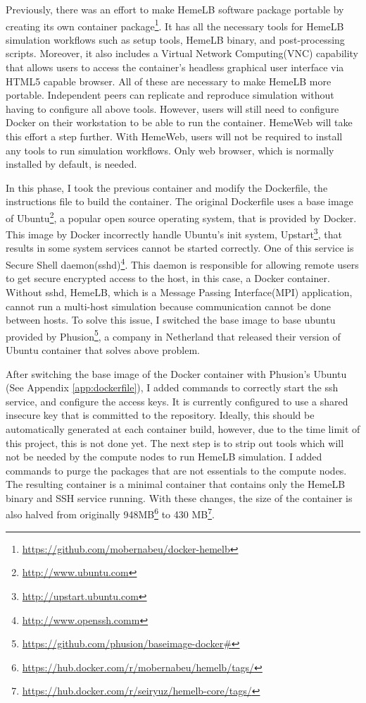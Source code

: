 Previously, there was an effort to make HemeLB software package portable by creating its own container package\footnote{\url{https://github.com/mobernabeu/docker-hemelb}}. It has all the necessary tools for HemeLB simulation workflows such as setup tools, HemeLB binary, and post-processing scripts. Moreover, it also includes a Virtual Network Computing(VNC) capability that allows users to access the container's headless graphical user interface via HTML5 capable browser. All of these are necessary to make HemeLB more portable. Independent peers can replicate and reproduce simulation without having to configure all above tools. However, users will still need to configure Docker on their workstation to be able to run the container. HemeWeb will take this effort a step further. With HemeWeb, users will not be required to install any tools to run simulation workflows. Only web browser, which is normally installed by default, is needed.


In this phase, I took the previous container and modify the Dockerfile, the instructions file to build the container. The original Dockerfile uses a base image of Ubuntu\footnote{\url{http://www.ubuntu.com}}, a popular open source operating system, that is provided by Docker. This image by Docker incorrectly handle Ubuntu's init system, Upstart\footnote{\url{http://upstart.ubuntu.com}}, that results in some system services cannot be started correctly. One of this service is Secure Shell daemon(sshd)\footnote{\url{http://www.openssh.comm}}. This daemon is responsible for allowing remote users to get secure encrypted access to the host, in this case, a Docker container. Without sshd, HemeLB, which is a Message Passing Interface(MPI) application, cannot run a multi-host simulation because communication cannot be done between hosts.  To solve this issue, I switched the base image to base ubuntu provided by Phusion\footnote{\url{https://github.com/phusion/baseimage-docker#}}, a company in Netherland that released their version of Ubuntu container that solves above problem.

After switching the base image of the Docker container with Phusion's Ubuntu (See Appendix  \ref{app:dockerfile}), I added commands to correctly start the ssh service, and configure the access keys. It is currently configured to use a shared insecure key that is committed to the repository. Ideally, this should be automatically generated at each container build, however, due to the  time limit of this project, this is not done yet. The next step is to strip out tools which will not be needed by the compute nodes to run HemeLB simulation. I added commands to purge the packages that are not essentials to the compute nodes. The resulting container is a minimal container that contains only the HemeLB binary and SSH service running. With these changes, the size of the container is also halved from originally 948MB\footnote{\url{https://hub.docker.com/r/mobernabeu/hemelb/tags/}} to 430 MB\footnote{\url{https://hub.docker.com/r/seiryuz/hemelb-core/tags/}}.


